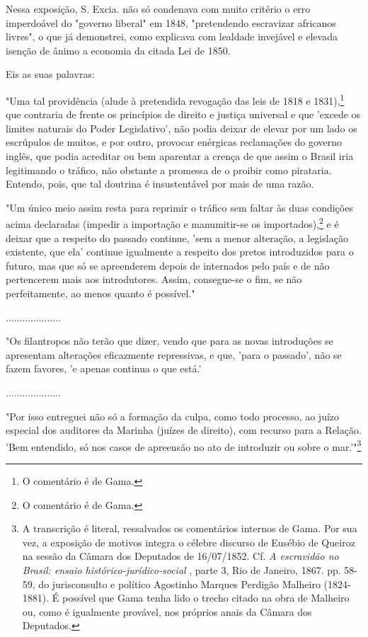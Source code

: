 Nessa exposição, S. Excia. não só condenava com muito critério o erro
imperdoável do "governo liberal" em 1848, "pretendendo escravizar
africanos livres", o que já demonstrei, como explicava com lealdade
invejável e elevada isenção de ânimo a economia da citada Lei de 1850.

Eis as suas palavras:

"Uma tal providência (alude à pretendida revogação das leis de 1818 e
1831),\footnote{O comentário é de Gama.} que contraria de frente os
princípios de direito e justiça universal e que 'excede os limites
naturais do Poder Legislativo', não podia deixar de elevar por um lado
os escrúpulos de muitos, e por outro, provocar enérgicas reclamações do
governo inglês, que podia acreditar ou bem aparentar a crença de que
assim o Brasil iria legitimando o tráfico, não obstante a promessa de o
proibir como pirataria. Entendo, pois, que tal doutrina é insustentável
por mais de uma razão.

"Um único meio assim resta para reprimir o tráfico sem faltar às duas
condições acima declaradas (impedir a importação e manumitir-se os
importados),\footnote{O comentário é de Gama.} e é deixar que a
respeito do passado continue, 'sem a menor alteração, a legislação
existente, que ela' continue igualmente a respeito dos pretos
introduzidos para o futuro, mas que só se apreenderem depois de
internados pelo país e de não pertencerem mais aos introdutores. Assim,
consegue-se o fim, se não perfeitamente, ao menos quanto é possível."

....................

"Os filantropos não terão que dizer, vendo que para as novas introduções
se apresentam alterações eficazmente repressivas, e que, 'para o
passado', não se fazem favores, 'e apenas continua o que está.'

....................

"Por isso entreguei não só a formação da culpa, como todo processo, ao
juízo especial dos auditores da Marinha (juízes de direito), com recurso
para a Relação. 'Bem entendido, só nos casos de apreensão no ato de
introduzir ou sobre o mar.'"\footnote{A transcrição é literal,
  ressalvados os comentários internos de Gama. Por sua vez, a exposição
  de motivos integra o célebre discurso de Eusébio de Queiroz na sessão
  da Câmara dos Deputados de 16/07/1852. Cf. \emph{A escravidão no
  Brasil: ensaio histórico-jurídico-social} , parte 3, Rio de Janeiro,
  1867. pp. 58-59, do jurisconsulto e político Agostinho Marques
  Perdigão Malheiro (1824-1881). É possível que Gama tenha lido o trecho
  citado na obra de Malheiro ou, como é igualmente provável, nos
  próprios anais da Câmara dos Deputados.}

